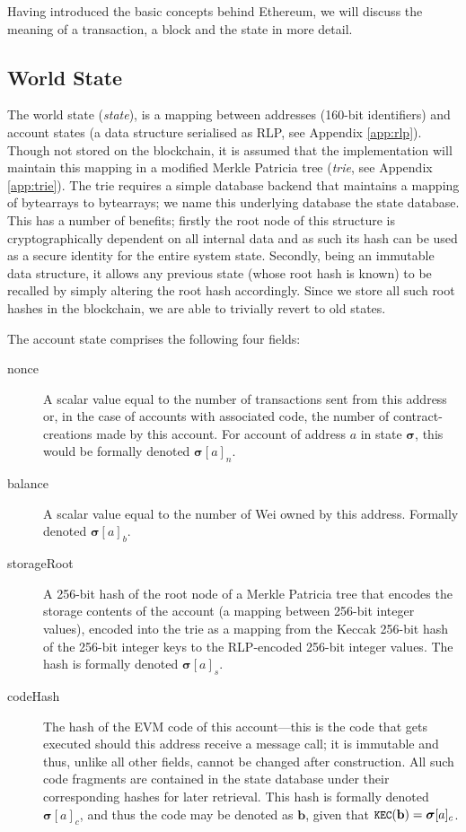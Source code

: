 \documentclass[9pt,oneside]{amsart}
\begin{document}
\begin{multicols}{2}
Having introduced the basic concepts behind Ethereum, we will discuss the meaning of a transaction, a block and the state in more detail.

\subsection{World State} \label{ch:state}

The world state (\textit{state}), is a mapping between addresses (160-bit identifiers) and account states (a data structure serialised as RLP, see Appendix \ref{app:rlp}). Though not stored on the blockchain, it is assumed that the implementation will maintain this mapping in a modified Merkle Patricia tree (\textit{trie}, see Appendix \ref{app:trie}). The trie requires a simple database backend that maintains a mapping of bytearrays to bytearrays; we name this underlying database the state database. This has a number of benefits; firstly the root node of this structure is cryptographically dependent on all internal data and as such its hash can be used as a secure identity for the entire system state. Secondly, being an immutable data structure, it allows any previous state (whose root hash is known) to be recalled by simply altering the root hash accordingly. Since we store all such root hashes in the blockchain, we are able to trivially revert to old states.

The account state comprises the following four fields:

\begin{description}
\item[nonce] A scalar value equal to the number of transactions sent from this address or, in the case of accounts with associated code, the number of contract-creations made by this account. For account of address $a$ in state $\boldsymbol{\sigma}$, this would be formally denoted $\boldsymbol{\sigma}[a]_n$.
\item[balance] A scalar value equal to the number of Wei owned by this address. Formally denoted $\boldsymbol{\sigma}[a]_b$.
\item[storageRoot] A 256-bit hash of the root node of a Merkle Patricia tree that encodes the storage contents of the account (a mapping between 256-bit integer values), encoded into the trie as a mapping from the Keccak 256-bit hash of the  256-bit integer keys to the RLP-encoded 256-bit integer values. The hash is formally denoted $\boldsymbol{\sigma}[a]_s$.
\item[codeHash] The hash of the EVM code of this account---this is the code that gets executed should this address receive a message call; it is immutable and thus, unlike all other fields, cannot be changed after construction. All such code fragments are contained in the state database under their corresponding hashes for later retrieval. This hash is formally denoted $\boldsymbol{\sigma}[a]_c$, and thus the code may be denoted as $\mathbf{b}$, given that $\texttt{\small KEC}(\mathbf{b}) = \boldsymbol{\sigma}[a]_c$.
\end{description}


\end{multicols}
\end{document}
